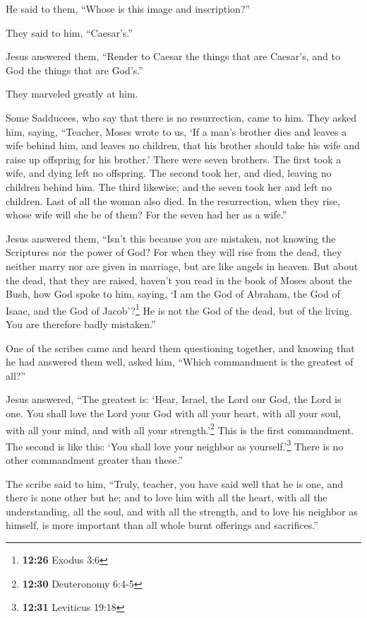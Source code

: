 He said to them, ``Whose is this image and inscription?''

They said to him, ``Caesar's.''

 Jesus answered them, ``Render to Caesar the things that
are Caesar's, and to God the things that are God's.''

They marveled greatly at him.

 Some Sadducees, who say that there is no resurrection,
came to him. They asked him, saying,  ``Teacher, Moses
wrote to us, `If a man's brother dies and leaves a wife behind him, and
leaves no children, that his brother should take his wife and raise up
offspring for his brother.'  There were seven brothers.
The first took a wife, and dying left no offspring.  The
second took her, and died, leaving no children behind him. The third
likewise;  and the seven took her and left no children.
Last of all the woman also died.  In the resurrection,
when they rise, whose wife will she be of them? For the seven had her as
a wife.''

 Jesus answered them, ``Isn't this because you are
mistaken, not knowing the Scriptures nor the power of God?
 For when they will rise from the dead, they neither
marry nor are given in marriage, but are like angels in heaven.
 But about the dead, that they are raised, haven't you
read in the book of Moses about the Bush, how God spoke to him, saying,
`I am the God of Abraham, the God of Isaac, and the God of
Jacob'?\footnote{\textbf{12:26} Exodus 3:6}  He is not
the God of the dead, but of the living. You are therefore badly
mistaken.''

 One of the scribes came and heard them questioning
together, and knowing that he had answered them well, asked him, ``Which
commandment is the greatest of all?''

 Jesus answered, ``The greatest is: `Hear, Israel, the
Lord our God, the Lord is one.  You shall love the Lord
your God with all your heart, with all your soul, with all your mind,
and with all your strength.'\footnote{\textbf{12:30} Deuteronomy 6:4-5}
This is the first commandment.  The second is like this:
`You shall love your neighbor as yourself.'\footnote{\textbf{12:31}
  Leviticus 19:18} There is no other commandment greater than these.''

 The scribe said to him, ``Truly, teacher, you have said
well that he is one, and there is none other but he;  and
to love him with all the heart, with all the understanding, all the
soul, and with all the strength, and to love his neighbor as himself, is
more important than all whole burnt offerings and sacrifices.''

